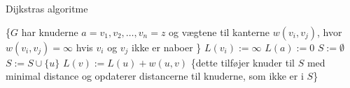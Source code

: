 \begin{algorithm}[H]
\caption{Dijkstras algoritme}
\begin{algorithmic}[1]

    \State \{$G$ {har knuderne $a = v_{1}, v_{2}, \dotsc, v_{n} = z$ og vægtene til kanterne $w(v_{i}, v_{j})$, hvor $w(v_{i}, v_{j}) = \infty$ hvis $v_{i}$ og $v_{j}$ ikke er naboer \}}
		\State $L(v_{i}) := \infty$
	\EndFor
	\State $L(a) := 0$	
	\State $S := \emptyset$
        \State $S := S \cup \{u\}$
        	 {$L(v) := L(u) + w(u,v)$}
        	\State \{dette tilføjer knuder til $S$ med minimal 			distance og opdaterer distancerne til
        	\State knuderne, som ikke er i $S$\}
        	\EndIf
    	\EndFor
    \EndWhile
\EndProcedure

\end{algorithmic}
\label{alg:dijkstra}
\end{algorithm}